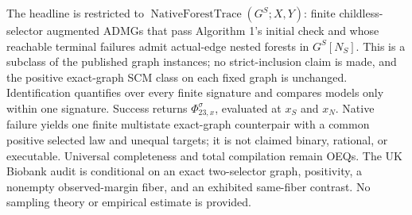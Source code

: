 The headline is restricted to \(\operatorname{NativeForestTrace}(G^S;X,Y)\): finite childless-selector augmented ADMGs that pass Algorithm 1's initial check and whose reachable terminal failures admit actual-edge nested forests in \(G^S[N_S]\). This is a subclass of the published graph instances; no strict-inclusion claim is made, and the positive exact-graph SCM class on each fixed graph is unchanged. Identification quantifies over every finite signature and compares models only within one signature. Success returns \(\Phi_{23,x}^{\sigma}\), evaluated at \(x_S\) and \(x_N\). Native failure yields one finite multistate exact-graph counterpair with a common positive selected law and unequal targets; it is not claimed binary, rational, or executable. Universal completeness and total compilation remain OEQs. The UK Biobank audit is conditional on an exact two-selector graph, positivity, a nonempty observed-margin fiber, and an exhibited same-fiber contrast. No sampling theory or empirical estimate is provided.